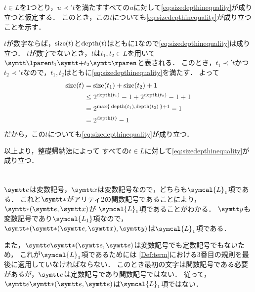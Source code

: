 \subsection*{}

\(t \in L\)を1つとり，\(u \prec' t\)を満たすすべての\(u\)に対して\cref{eq:sizedepthinequality}が成り立つと仮定する．
このとき，この\(t\)についても\cref{eq:sizedepthinequality}が成り立つことを示す．

\(t\)が数字ならば，\(\apply{\size}{t}\)と\(\apply{\depth}{t}\)はともに1なので\cref{eq:sizedepthinequality}は成り立つ．
\(t\)が数字でないとき，\(t\)は\(t_1, t_2 \in L\)を用いて\(\obj{\lparen} t_1 \obj{+} t_2 \obj{\rparen}\)と表される．
このとき，\(t_1 \prec' t\)かつ\(t_2 \prec' t\)なので，\(t_1, t_2\)はともに\cref{eq:sizedepthinequality}を満たす．
よって
\begin{align*}
	\apply{\size}{t} & = \apply{\size}{t_1} + \apply{\size}{t_2} + 1                      \\
	                 & \leq 2^{\apply{\depth}{t_1}} - 1 + 2^{\apply{\depth}{t_2}} - 1 + 1 \\
	                 & = 2^{\max\Set{\apply{\depth}{t_1}, \apply{\depth}{t_2}} + 1} - 1   \\
	                 & = 2^{\apply{\depth}{t}} - 1
\end{align*}
だから，この\(t\)についても\cref{eq:sizedepthinequality}が成り立つ．

以上より，整礎帰納法によって
すべての\(t \in L\)に対して\cref{eq:sizedepthinequality}が成り立つ．


\section*{}

\subsection*{}

\(\obj{e}\)は変数記号，\(\obj{x}\)は変数記号なので，どちらも\(\symcal{L}_1\)項である．
これと\(\obj{\ast}\)がアリティ2の関数記号であることにより，\(\apply{\obj{\ast}}{\obj{e}, \obj{x}}\)が
\(\symcal{L}_1\)項であることがわかる．
\(\obj{y}\)も変数記号であり\(\symcal{L_1}\)項なので，
\(\apply{\obj{\ast}}{\apply{\obj{\ast}}{\obj{e}, \obj{x}}, \obj{y}}\)は\(\symcal{L}_1\)項である．

また，\(\obj{e}\apply{\mathord{\obj{\ast}}}{\obj{e}, \obj{e}}\)は変数記号でも定数記号でもないため，
これが\(\symcal{L}_1\)項であるためには
\cref{Def:term}における3番目の規則を最後に適用していなければならない．
このとき最初の文字は関数記号である必要があるが，\(\obj{e}\)は定数記号であり関数記号ではない．
従って，\(\obj{e}\apply{\mathord{\obj{\ast}}}{\obj{e}, \obj{e}}\)は\(\symcal{L}_1\)項ではない．

